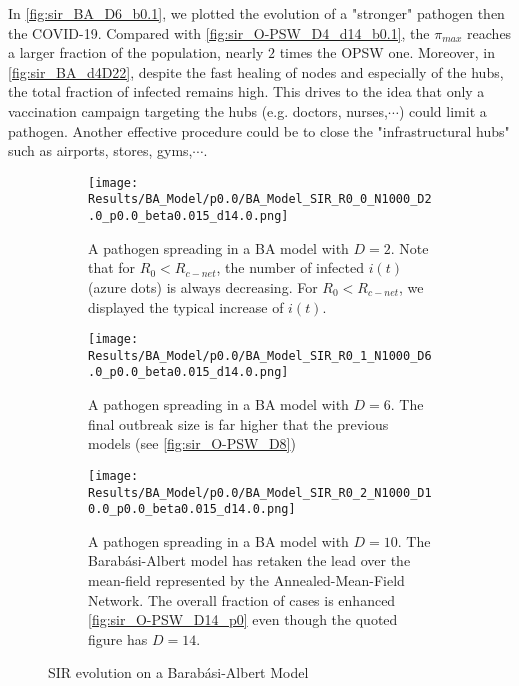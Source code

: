 \documentclass[a4paper,10pt,twoside]{book} %
\theoremstyle{definition}
\begin{document}
In \autoref{fig:sir_BA_D6_b0.1}, we plotted the evolution of a "stronger" pathogen then the COVID-19.
Compared with \autoref{fig:sir_O-PSW_D4_d14_b0.1}, the $ \pi_{max} $ reaches a larger fraction of the population, nearly $ 2$ times the OPSW one.
Moreover, in \autoref{fig:sir_BA_d4D22}, despite the fast healing of nodes and especially of the hubs, the total fraction of infected remains high. This drives to the idea that only a vaccination campaign targeting the hubs (e.g. doctors, nurses,$\cdots$) could limit a pathogen. Another effective procedure could be to close the "infrastructural hubs" such as airports, stores, gyms,$ \cdots $.

\begin{figure}[p]
	\begin{subfigure}{.9\linewidth}
		\texttt{[image: Results/BA\_Model/p0.0/BA\_Model\_SIR\_R0\_0\_N1000\_D2.0\_p0.0\_beta0.015\_d14.0.png]}
		\caption{A pathogen spreading in a BA model with $D = 2$. Note that for $ R_0 < R_{c-net} $, the number of infected $ i(t)$ (azure dots) is always decreasing. For $ R_0 < R_{c-net} $, we displayed the typical increase of $ i(t)$.}
		\label{fig:sir_BA_D2}
	\end{subfigure}
	\vspace{.5cm}
	\begin{subfigure}{.9\linewidth}
		\texttt{[image: Results/BA\_Model/p0.0/BA\_Model\_SIR\_R0\_1\_N1000\_D6.0\_p0.0\_beta0.015\_d14.0.png]}
		\caption{A pathogen spreading in a BA model with $D = 6$. The final outbreak size is far higher that the previous models (see \autoref{fig:sir_O-PSW_D8})}
		\label{fig:sir_BA_D6}
	\end{subfigure}
	\vfill
	\begin{subfigure}{.9\linewidth}
		\texttt{[image: Results/BA\_Model/p0.0/BA\_Model\_SIR\_R0\_2\_N1000\_D10.0\_p0.0\_beta0.015\_d14.0.png]}
		\caption{A pathogen spreading in a BA model with $D = 10$. The Barabási-Albert model has retaken the lead over the mean-field represented by the Annealed-Mean-Field Network. The overall fraction of cases is enhanced \autoref{fig:sir_O-PSW_D14_p0} even though the quoted figure has $ D = 14$.}
		\label{fig:sir_BA_D10}
	\end{subfigure}
	\caption{SIR evolution on a Barabási-Albert Model}
	\label{fig:sir_BA_COVID}
\end{figure}

\clearpage
\end{document}
